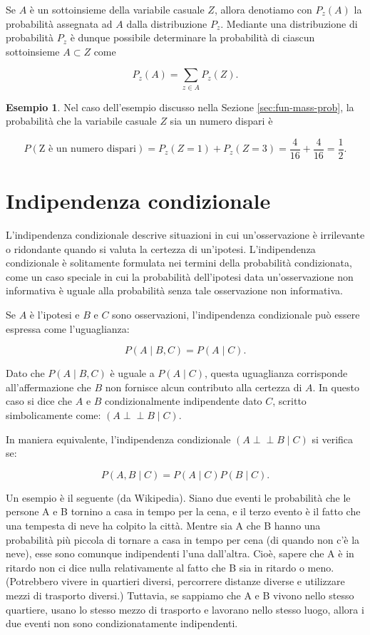 \documentclass[
  11pt,
]{krantz}
\theoremstyle{definition}
\theoremstyle{definition}
\newtheorem{example}{Esempio}[chapter]
\theoremstyle{definition}
\theoremstyle{definition}
\theoremstyle{remark}
\begin{document}
Se \(A\) è un sottoinsieme della variabile casuale \(Z\), allora denotiamo con \(P_{z}(A)\) la probabilità assegnata ad \(A\) dalla distribuzione \(P_{z}\). Mediante una distribuzione di probabilità \(P_{z}\) è dunque possibile determinare la probabilità di ciascun sottoinsieme \(A \subset Z\) come

\[
P_{z}(A) = \sum_{z \in A} P_{z}(Z).
\]

\begin{example}
Nel caso dell'esempio discusso nella Sezione \ref{sec:fun-mass-prob}, la probabilità che la variabile casuale \(Z\) sia un numero dispari è

\[
P(\text{Z è un numero dispari}) = P_{z}(Z = 1) + P_{z}(Z = 3) = \frac{4}{16} + \frac{4}{16} = \frac{1}{2}.
\]
\end{example}

\hypertarget{indipendenza-condizionale}{%
\section{Indipendenza condizionale}\label{indipendenza-condizionale}}

L'indipendenza condizionale descrive situazioni in cui un'osservazione è irrilevante o ridondante quando si valuta la certezza di un'ipotesi. L'indipendenza condizionale è solitamente formulata nei termini della probabilità condizionata, come un caso speciale in cui la probabilità dell'ipotesi data un'osservazione non informativa è uguale alla probabilità senza tale osservazione non informativa.

Se \(A\) è l'ipotesi e \(B\) e \(C\) sono osservazioni, l'indipendenza condizionale può essere espressa come l'uguaglianza:

\[
P(A \mid B,C)=P(A \mid C).
\]

Dato che \(P(A \mid B,C)\) è uguale a \(P(A \mid C)\), questa uguaglianza corrisponde all'affermazione che \(B\) non fornisce alcun contributo alla certezza di \(A\). In questo caso si dice che \(A\) e \(B\) condizionalmente indipendente dato \(C\), scritto simbolicamente come: \((A \perp\!\!\!\!\perp B \mid C)\).

In maniera equivalente, l'indipendenza condizionale \((A \perp\!\!\!\!\perp B \mid C)\) si verifica se:

\[
P(A, B \mid C) = P(A \mid C) P(B \mid C).
\]

Un esempio è il seguente (da Wikipedia). Siano due eventi le probabilità che le persone A e B tornino a casa in tempo per la cena, e il terzo evento è il fatto che una tempesta di neve ha colpito la città. Mentre sia A che B hanno una probabilità più piccola di tornare a casa in tempo per cena (di quando non c'è la neve), esse sono comunque indipendenti l'una dall'altra. Cioè, sapere che A è in ritardo non ci dice nulla relativamente al fatto che B sia in ritardo o meno. (Potrebbero vivere in quartieri diversi, percorrere distanze diverse e utilizzare mezzi di trasporto diversi.) Tuttavia, se sappiamo che A e B vivono nello stesso quartiere, usano lo stesso mezzo di trasporto e lavorano nello stesso luogo, allora i due eventi non sono condizionatamente indipendenti.
\end{document}
